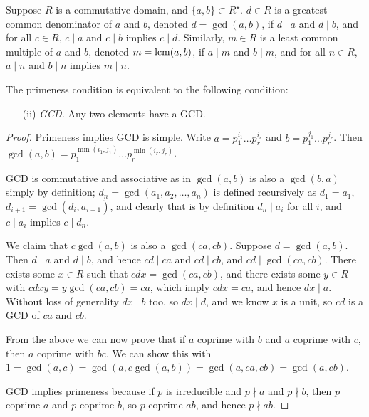 \begin{definition}
    Suppose \(R\) is a commutative domain, and \(\{a,b\} \subset R^\star\).
    \(d \in R\) is a greatest common denominator of \(a\) and \(b\),
    denoted \(d = \gcd(a,b)\),
    if \(d \mid a\) and \(d \mid b\),
    and for all \(c \in R\), \(c \mid a\) and \(c \mid b\) implies \(c \mid d\).
    Similarly, \(m \in R\) is a least common multiple of \(a\) and \(b\),
    denoted \(m = \operatorname{lcm}(a,b)\),
    if \(a \mid m\) and \(b \mid m\),
    and for all \(n \in R\), \(a \mid n\) and \(b \mid n\) implies \(m \mid n\).
\end{definition}
\begin{theorem}
    The primeness condition is equivalent to the following condition:
    \begin{enumerate}[itemsep=0mm]
        \item[(ii)] \textit{GCD.}
        Any two elements have a GCD.\@
    \end{enumerate}
\end{theorem}
\begin{proof}
    Primeness implies GCD is simple.
    Write \(a = p_1^{i_1} \hdots p_r^{i_r}\)
    and \(b = p_1^{j_1} \hdots p_r^{j_r}\).
    Then \(\gcd(a,b) = p_1^{\min(i_1,j_1)} \hdots p_r^{\min(i_r,j_r)}\).

    \medskip

    GCD is commutative and associative
    as in \(\gcd(a,b)\) is also a \(\gcd(b,a)\) simply by definition;
    \(d_n = \gcd(a_1,a_2,\hdots,a_n)\) is defined recursively as
    \(d_1 = a_1\), \(d_{i+1} = \gcd(d_i,a_{i+1})\),
    and clearly that is by definition \(d_n \mid a_i\) for all \(i\),
    and \(c \mid a_i\) implies \(c \mid d_n\).

    We claim that \(c\gcd(a,b)\) is also a \(\gcd(ca,cb)\).
    Suppose \(d = \gcd(a,b)\).
    Then \(d \mid a\) and \(d \mid b\),
    and hence \(cd \mid ca\) and \(cd \mid cb\),
    and \(cd \mid \gcd(ca,cb)\).
    There exists some \(x \in R\) such that \(cdx = \gcd(ca,cb)\),
    and there exists some \(y \in R\) with \(cdxy = y\gcd(ca,cb) = ca\),
    which imply \(cdx = ca\), and hence \(dx \mid a\).
    Without loss of generality \(dx \mid b\) too, so \(dx \mid d\),
    and we know \(x\) is a unit, so \(cd\) is a GCD of \(ca\) and \(cb\).

    From the above we can now prove that if \(a\) coprime with \(b\)
    and \(a\) coprime with \(c\),
    then \(a\) coprime with \(bc\).
    We can show this with \(1 = \gcd(a,c) = \gcd(a,c\gcd(a,b))
    = \gcd(a,ca,cb) = \gcd(a,cb)\).

    GCD implies primeness because if \(p\) is irreducible
    and \(p \nmid a\) and \(p \nmid b\),
    then \(p\) coprime \(a\) and \(p\) coprime \(b\),
    so \(p\) coprime \(ab\),
    and hence \(p \nmid ab\).
\end{proof}

